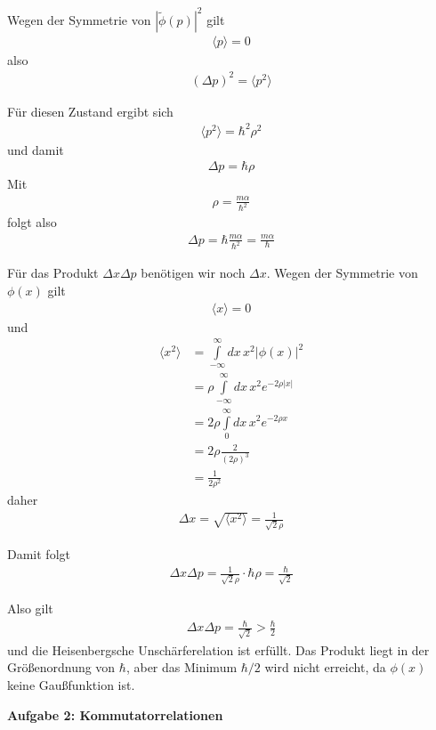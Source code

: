 \documentclass[11pt,a4paper]{scrartcl}
\begin{document}
\begin{enumerate}[label=(\alph*)]
\begin{tcolorbox}[title=Berechnung, breakable]
        Wegen der Symmetrie von $|\tilde{\phi}(p)|^2$ gilt
        \begin{align*}
            \langle p \rangle = 0
        \end{align*}
        also
        \begin{align*}
            (\Delta p)^2 = \langle p^2\rangle
        \end{align*}

        Für diesen Zustand ergibt sich
        \begin{align*}
            \langle p^2\rangle = \hbar^2\rho^2
        \end{align*}
        und damit
        \begin{align*}
            \Delta p = \hbar\rho
        \end{align*}
        Mit
        \begin{align*}
            \rho = \frac{m\alpha}{\hbar^2}
        \end{align*}
        folgt also
        \begin{align*}
            \Delta p = \hbar \frac{m\alpha}{\hbar^2} = \frac{m\alpha}{\hbar}
        \end{align*}

        Für das Produkt $\Delta x \Delta p$ benötigen wir noch $\Delta x$. Wegen der Symmetrie von $\phi(x)$ gilt
        \begin{align*}
            \langle x \rangle = 0
        \end{align*}
        und
        \begin{align*}
            \langle x^2\rangle &= \int\limits_{-\infty}^{\infty} dx\, x^2 |\phi(x)|^2\\
            &= \rho \int\limits_{-\infty}^{\infty} dx\, x^2 e^{-2\rho |x|}\\
            &= 2\rho \int\limits_{0}^{\infty} dx\, x^2 e^{-2\rho x}\\
            &= 2\rho \frac{2}{(2\rho)^3}\\
            &= \frac{1}{2\rho^2}
        \end{align*}
        daher
        \begin{align*}
            \Delta x = \sqrt{\langle x^2\rangle} = \frac{1}{\sqrt{2}\rho}
        \end{align*}

        Damit folgt
        \begin{align*}
            \Delta x \Delta p = \frac{1}{\sqrt{2}\rho}\cdot \hbar\rho = \frac{\hbar}{\sqrt{2}}
        \end{align*}

        Also gilt
        \begin{align*}
            \Delta x \Delta p = \frac{\hbar}{\sqrt{2}} > \frac{\hbar}{2}
        \end{align*}
        und die Heisenbergsche Unschärferelation ist erfüllt. Das Produkt liegt in der Größenordnung von $\hbar$, aber das Minimum $\hbar/2$ wird nicht erreicht, da $\phi(x)$ keine Gaußfunktion ist.
    \end{tcolorbox}
\end{enumerate}
\newpage
\textbf{Aufgabe 2: Kommutatorrelationen}
\end{document}
